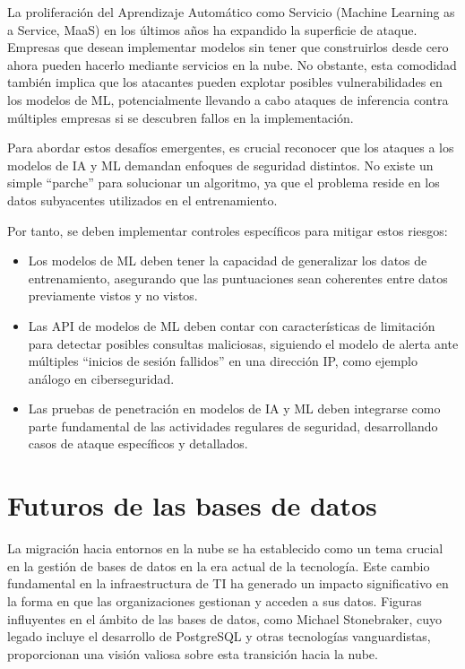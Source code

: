 \documentclass[11pt]{report}
\begin{document}
La proliferación del Aprendizaje Automático como Servicio (Machine Learning as a Service, MaaS) en los últimos años ha expandido la superficie de ataque.
Empresas que desean implementar modelos sin tener que construirlos desde cero ahora pueden hacerlo mediante servicios en la nube. No obstante, esta comodidad
también implica que los atacantes pueden explotar posibles vulnerabilidades en los modelos de ML, potencialmente llevando a cabo ataques de inferencia contra
múltiples empresas si se descubren fallos en la implementación.

Para abordar estos desafíos emergentes, es crucial reconocer que los ataques a los modelos de IA y ML demandan enfoques de seguridad distintos. No existe un
simple “parche” para solucionar un algoritmo, ya que el problema reside en los datos subyacentes utilizados en el entrenamiento.

Por tanto, se deben implementar controles específicos para mitigar estos riesgos:
\begin{itemize}
  \item Los modelos de ML deben tener la capacidad de generalizar los datos de entrenamiento, asegurando que las puntuaciones sean coherentes entre datos
  previamente vistos y no vistos.

  \item Las API de modelos de ML deben contar con características de limitación para detectar posibles consultas maliciosas, siguiendo el modelo de alerta
  ante múltiples “inicios de sesión fallidos” en una dirección IP, como ejemplo análogo en ciberseguridad.
  
  \item Las pruebas de penetración en modelos de IA y ML deben integrarse como parte fundamental de las actividades regulares de seguridad, desarrollando
  casos de ataque específicos y detallados.
\end{itemize}

\cleardoublepage

\section{Futuros de las bases de datos}
La migración hacia entornos en la nube se ha establecido como un tema crucial en la gestión de bases de datos en la era actual de la tecnología. Este 
cambio fundamental en la infraestructura de TI ha generado un impacto significativo en la forma en que las organizaciones gestionan y acceden a sus datos.
Figuras influyentes en el ámbito de las bases de datos, como Michael Stonebraker, cuyo legado incluye el desarrollo de PostgreSQL y otras tecnologías vanguardistas,
proporcionan una visión valiosa sobre esta transición hacia la nube.
\end{document}
